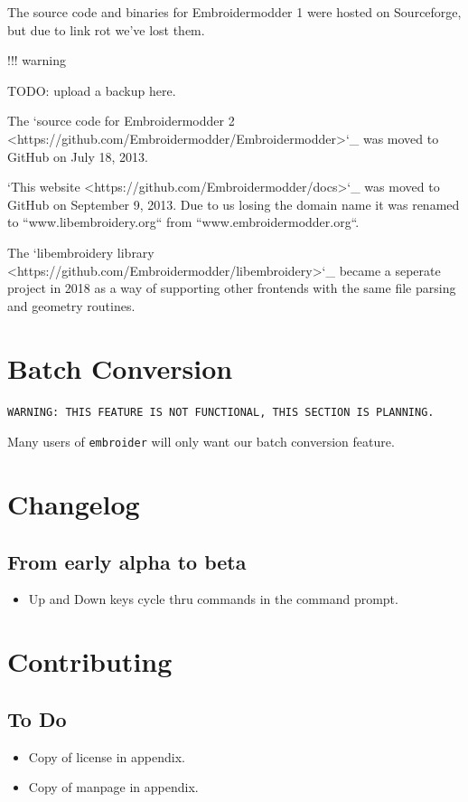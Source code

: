 The source code and binaries for Embroidermodder 1 were hosted on Sourceforge, but
due to link rot we've lost them.

!!! warning

    TODO: upload a backup here.

The `source code for Embroidermodder 2 <https://github.com/Embroidermodder/Embroidermodder>`_
was moved to GitHub on July 18, 2013.

`This website <https://github.com/Embroidermodder/docs>`_ was moved
to GitHub on September 9, 2013. Due to us losing the domain name it was renamed
to ``www.libembroidery.org`` from ``www.embroidermodder.org``.

The `libembroidery library <https://github.com/Embroidermodder/libembroidery>`_
became a seperate project in 2018 as a way of supporting other frontends with
the same file parsing and geometry routines.

\section{Batch Conversion}

\texttt{WARNING: THIS FEATURE IS NOT FUNCTIONAL, THIS SECTION IS PLANNING.}

Many users of \texttt{embroider} will only want our batch conversion feature.

\section{Changelog}

\subsection{From early alpha to beta}

\begin{itemize}
\item Up and Down keys cycle thru commands in the command prompt.
\end{itemize}

\section{Contributing}

\subsection{To Do}

\begin{itemize}
\item Copy of license in appendix.
\item Copy of manpage in appendix.
\end{itemize}

